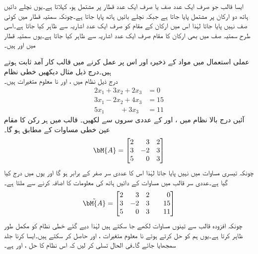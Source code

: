 ایسا قالب جو صرف ایک عدد صف یا صرف ایک عدد قطار پر مشتمل ہو،  کہلاتا ہے۔یوں نچلے دائیں ہاتھ دو ارکان پر مشتمل  پایا جاتا ہے جبکہ نچلے بائیں ہاتھ  پایا جاتا ہے۔چونکہ سمتیہ قطار میں کوئی صف نہیں پایا جاتا لہٰذا اس میں ارکان کے مقام کو صرف ایک عدد اشاریہ سے ظاہر کیا جاتا ہے۔اسی طرح سمتیہ صف میں بھی ارکان کا مقام صرف ایک عدد اشاریہ سے ظاہر کیا جاتا ہے۔یوں سمتیہ قطار میں  اور  ہیں۔

عملی استعمال میں مواد کے ذخیرہ اور اس پر عمل کرنے میں قالب کار آمد ثابت ہوتے ہیں۔درج ذیل مثال دیکھیں
\quad خطی نظام\\
درج ذیل  نظام میں ،  اور  نا معلوم متغیرات ہیں۔ 
\begin{align*}
2x_1+3x_2+2x_3&=0\\
3x_1-2x_2+4x_3&=15\\
5x_1\phantom{+3x_2}+3x_3&=11
\end{align*}
آئیں درج بالا نظام میں ،  اور  کے عددی سروں سے    لکھیں۔  قالب میں ہر رکن کا مقام عین خطی مساوات کے مطابق ہو گا۔
\begin{align*}
\bM{A}=
\begin{bmatrix*}[r]
2&3&2\\
3&-2&3\\
5&0&3
\end{bmatrix*}
\end{align*} 
چونکہ تیسری مساوات میں  نہیں پایا جاتا لہٰذا اس کا عددی سر صفر کے برابر ہو گا اور یوں  میں  درج کیا گیا ہے۔عددی سر قالب  میں مساوات کے دائیں ہاتھ کی معلومات کا اضافہ کرنے سے   ملتا ہے۔
\begin{align*}
\tilde{\bM{A}}=
\begin{bmatrix*}[r]
2&3&2&& 0\\
3&-2&3& &15\\
5&0&3&&11
\end{bmatrix*}
\end{align*}
چونکہ افزودہ قالب  سے تینوں مساوات لکھے جا سکتے ہیں لہٰذا دیے گئے خطی نظام کو  مکمل طور ظاہر کرتا ہے۔یوں ہم  کو حل کرتے ہوئے نا معلوم متغیرات ،  اور  حاصل کر سکتے ہیں۔ایسا کرنا جلد سمجھایا جائے گا۔فی الحال تسلی کر لیں کہ اس نظام کا حل ،  اور  ہے۔

